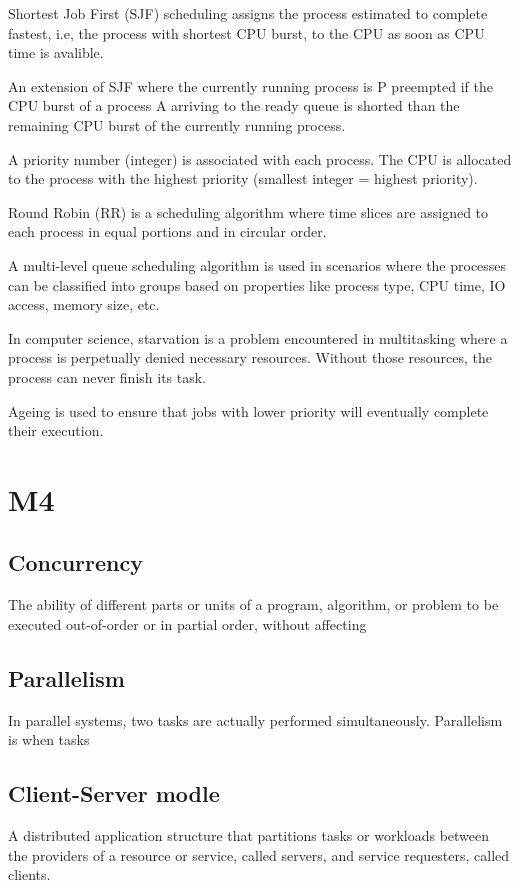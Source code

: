 \begin{multicols}{2}
Shortest Job First (SJF) scheduling assigns the process
estimated to complete fastest, i.e, the process with
shortest CPU burst, to the CPU as soon as CPU time is avalible. \newline

An extension of SJF where the currently running process is P
preempted if the CPU burst of a process A arriving to the ready
queue is shorted than the remaining CPU burst of the currently
running process. \newline

A priority number (integer) is associated with each process.
The CPU is allocated to the process with the highest priority
(smallest integer = highest priority). \newline

Round Robin (RR) is a scheduling algorithm where time slices
are assigned to each process in equal portions and in circular
order. \newline

A multi-level queue scheduling algorithm is used in scenarios where
the processes can be classified into groups based on properties like
process type, CPU time, IO access, memory size, etc. \newline

In computer science, starvation is a problem encountered in
multitasking where a process is perpetually denied necessary
resources. Without those resources, the process can never finish its
task. \newline

Ageing is used to ensure that jobs with lower
priority will eventually complete their
execution.

\section{M4}
\subsection{Concurrency}
The ability of different parts or units of a
program, algorithm, or problem to be executed
out-of-order or in partial order, without affecting

\subsection{Parallelism}
In parallel systems, two tasks
are actually performed
simultaneously.
Parallelism is when tasks

\subsection{Client-Server modle}
A distributed application structure that partitions
tasks or workloads between the providers of a
resource or service, called servers, and service
requesters, called clients.


\end{multicols}

